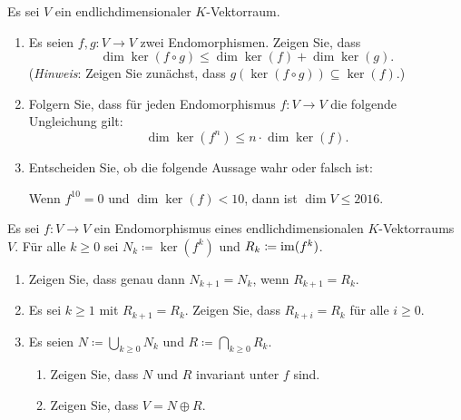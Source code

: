 \documentclass[a4paper, 10pt]{scrartcl}
\begin{document}
\begin{question}
  Es sei $V$ ein endlichdimensionaler $K$-Vektorraum.
  \begin{enumerate}[leftmargin=*]
    \item
      Es seien $f, g \colon V \to V$ zwei Endomorphismen.
      Zeigen Sie, dass
      \[
        \dim \ker(f \circ g) \leq \dim \ker(f) + \dim \ker(g).
      \]
      (\emph{Hinweis}: Zeigen Sie zunächst, dass $g(\ker(f \circ g)) \subseteq \ker(f)$.)
    \item
      Folgern Sie, dass für jeden Endomorphismus $f \colon V \to V$ die folgende Ungleichung gilt:
      \[
        \dim \ker(f^n) \leq n \cdot \dim \ker(f).
      \]
    \item
      Entscheiden Sie, ob die folgende Aussage wahr oder falsch ist:
      
      Wenn $f^{10} = 0$ und $\dim \ker(f) < 10$, dann ist $\dim V \leq 2016$.
  \end{enumerate}
\end{question}


\begin{question}
  Es sei $f \colon V \to V$ ein Endomorphismus eines endlichdimensionalen $K$-Vektorraums $V$.
  Für alle $k \geq 0$ sei $N_k \coloneqq \ker(f^k)$ und $R_k \coloneqq \operatorname{im}(f^k)$.
  \begin{enumerate}[leftmargin=*]
    \item
      Zeigen Sie, dass genau dann $N_{k+1} = N_k$, wenn $R_{k+1} = R_k$.
    \item
      Es sei $k \geq 1$ mit $R_{k+1} = R_k$.
      Zeigen Sie, dass $R_{k+i} = R_k$ für alle $i \geq 0$.
    \item
      Es seien $N \coloneqq \bigcup_{k \geq 0} N_k$ und $R \coloneqq \bigcap_{k \geq 0} R_k$.
      \begin{enumerate}
        \item
          Zeigen Sie, dass $N$ und $R$ invariant unter $f$ sind.
        \item
          Zeigen Sie, dass $V = N \oplus R$.
      \end{enumerate}
  \end{enumerate}
\end{question}
\end{document}
